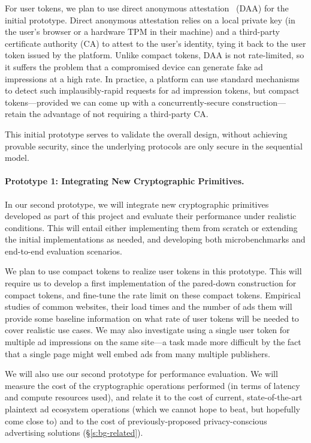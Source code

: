 %
For user tokens, we plan to use direct anonymous attestation~\cite{direct-anon-attest} (DAA) for the initial prototype.
%
Direct anonymous attestation relies on a local private key (in the user's browser or a hardware TPM in their machine) and a third-party certificate authority (CA) to attest to the user's identity, tying it back to the user token issued by the platform.
%
Unlike compact tokens, DAA is not rate-limited, so it suffers the problem that a compromised device can generate fake ad impressions at a high rate.
%
In practice, a platform can use standard mechanisms to detect such implausibly-rapid requests for ad impression tokens, but compact tokens---provided we can come up with a concurrently-secure construction---retain the advantage of not requiring a third-party CA.
%

%
This initial prototype serves to validate the overall design, without achieving provable security, since the underlying protocols are only secure in the sequential model.
%

\paragraph{Prototype 1: Integrating New Cryptographic Primitives.}
%
In our second prototype, we will integrate new cryptographic primitives developed as part of this project and evaluate their performance under realistic conditions.
%
This will entail either implementing them from scratch or extending the initial implementations as needed, and developing both microbenchmarks and end-to-end evaluation scenarios.
%

%
We plan to use compact tokens to realize user tokens in this prototype.
%
This will require us to develop a first implementation of the pared-down construction for compact tokens, and fine-tune the rate limit on these compact tokens.
%
Empirical studies of common websites, their load times and the number of ads them will provide some baseline information on what rate of user tokens will be needed to cover realistic use cases.
%
We may also investigate using a single user token for multiple ad impressions on the same site---a task made more difficult by the fact that a single page might well embed ads from many multiple publishers.
%

%
We will also use our second prototype for performance evaluation.
%
We will measure the cost of the cryptographic operations performed (in terms of latency and compute resources used), and relate it to the cost of current, state-of-the-art plaintext ad ecosystem operations (which we cannot hope to beat, but hopefully come close to) and to the cost of previously-proposed privacy-conscious advertising solutions (\S\ref{s:bg-related}).
%

